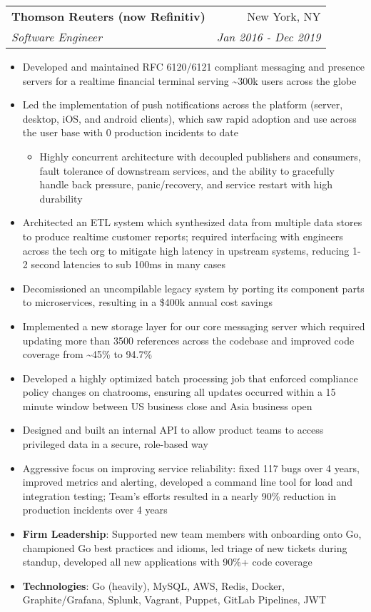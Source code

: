 \documentclass[letterpaper,11pt]{article}
\makeatletter
\newcommand{\resumeItem}[2]{
  \item\small{
    \textbf{#1}{: #2 \vspace{-1.5pt}}
  }
}
\newcommand{\resumeItemSimple}[1]{
  \item\small{
    {#1 \vspace{-1.5pt}}
  }
}
\newcommand{\resumeItemSimpleIndented}[1]{
  \item[--]\small{
    {#1 \vspace{-1.5pt}}
  }
}
\newcommand{\resumeSubheading}[4]{
  \vspace{-1pt}\item
    \begin{tabular*}{0.97\textwidth}[t]{l@{\extracolsep{\fill}}r}
      \textbf{#1} & #2 \\
      \textit{\small#3} & \textit{\small #4} \\
    \end{tabular*}\vspace{-5pt}
}
\newcommand{\resumeItemListStart}{\begin{itemize}}
\newcommand{\resumeItemListEnd}{\end{itemize}\vspace{-5pt}}
\makeatother
\begin{document}
    \resumeSubheading
      {Thomson Reuters (now Refinitiv)}{New York, NY}
      {Software Engineer}{Jan 2016 - Dec 2019}
      \resumeItemListStart
        \resumeItemSimple
          {Developed and maintained RFC 6120/6121 compliant messaging and presence servers for a realtime financial terminal serving \raisebox{-0.7ex}\textasciitilde 300k users across the globe}
        \resumeItemSimple
          {Led the implementation of push notifications across the platform (server, desktop, iOS, and android clients), which saw rapid adoption and use across the user base with 0 production incidents to date}
        \begin{itemize}[leftmargin=.2in]\resumeItemSimpleIndented
          {Highly concurrent architecture with decoupled publishers and consumers, fault tolerance of downstream services, and the ability to gracefully handle back pressure, panic/recovery, and service restart with high durability}
        \end{itemize}
        \resumeItemSimple
          {Architected an ETL system which synthesized data from multiple data stores to produce realtime customer reports; required interfacing with engineers across the tech org to mitigate high latency in upstream systems, reducing 1-2 second latencies to sub 100ms in many cases}
        \resumeItemSimple
          {Decomissioned an uncompilable legacy system by porting its component parts to microservices, resulting in a \$400k annual cost savings}
        \resumeItemSimple
          {Implemented a new storage layer for our core messaging server which required updating more than 3500 references across the codebase and improved code coverage from \raisebox{-0.7ex}\textasciitilde 45\% to 94.7\%}
        \resumeItemSimple
          {Developed a highly optimized batch processing job that enforced compliance policy changes on chatrooms, ensuring all updates occurred within a 15 minute window between US business close and Asia business open}
        \resumeItemSimple
          {Designed and built an internal API to allow product teams to access privileged data in a secure, role-based way}
        \resumeItemSimple
          {Aggressive focus on improving service reliability: fixed 117 bugs over 4 years, improved metrics and alerting, developed a command line tool for load and integration testing; Team's efforts resulted in a nearly 90\% reduction in production incidents over 4 years}
        \resumeItem{Firm Leadership}
        {Supported new team members with onboarding onto Go, championed Go best practices and idioms, led triage of new tickets during standup, developed all new applications with 90\%+ code coverage}
        \resumeItem{Technologies}
        {Go (heavily), MySQL, AWS, Redis, Docker, Graphite/Grafana, Splunk, Vagrant, Puppet, GitLab Pipelines, JWT}
      \resumeItemListEnd
\end{document}
